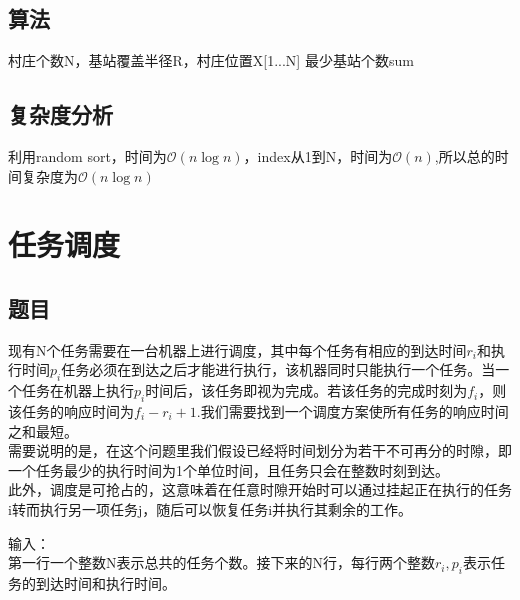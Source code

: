 \documentclass[UTF8]{ctexart}
\begin{document}
\subsection{算法}
\renewcommand{\algorithmicrequire}{\textbf{输入:}}
\renewcommand{\algorithmicensure}{\textbf{输出:}}
\begin{algorithm}
	\caption{}
	\begin{algorithmic}[1]
	\Require 村庄个数N，基站覆盖半径R，村庄位置X[1...N]
	\Ensure 最少基站个数sum
		\EndWhile
		\EndWhile
	\EndWhile\\
	\end{algorithmic}
\end{algorithm}

\subsection{复杂度分析}
利用random sort，时间为$\mathcal{O}(n\log n)$，index从1到N，时间为$\mathcal{O}(n)$,所以总的时间复杂度为$\mathcal{O}(n\log n)$


\section{任务调度}
\subsection{题目}
现有N个任务需要在一台机器上进行调度，其中每个任务有相应的到达时间$r_i$和执行时间$p_i$任务必须在到达之后才能进行执行，该机器同时只能执行一个任务。当一个任务在机器上执行$p_i$时间后，该任务即视为完成。若该任务的完成时刻为$f_i$，则该任务的响应时间为$f_i-r_i+1$.我们需要找到一个调度方案使所有任务的响应时间之和最短。\\
需要说明的是，在这个问题里我们假设已经将时间划分为若干不可再分的时隙，即一个任务最少的执行时间为1个单位时间，且任务只会在整数时刻到达。\\
此外，调度是可抢占的，这意味着在任意时隙开始时可以通过挂起正在执行的任务i转而执行另一项任务j，随后可以恢复任务i并执行其剩余的工作。

输入：\\
第一行一个整数N表示总共的任务个数。接下来的N行，每行两个整数$r_i,p_i$表示任务的到达时间和执行时间。
\end{document}

